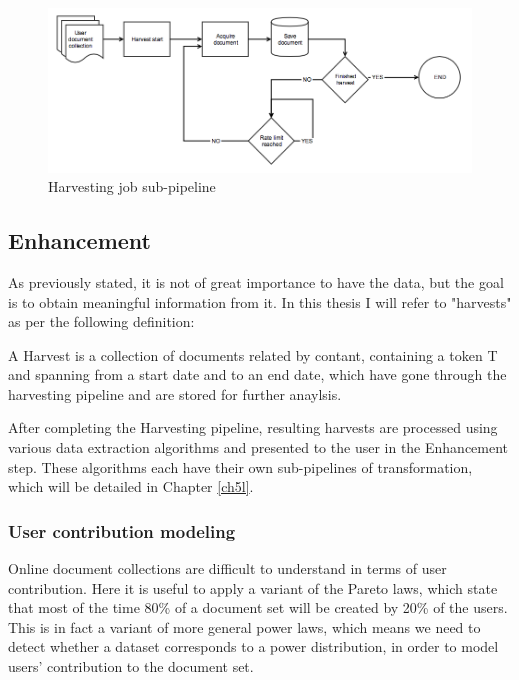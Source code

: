 \begin{figure}[ht]
    \centering
\includegraphics[width=\columnwidth]{img/harvestpipe.png}
    \caption{Harvesting job sub-pipeline}
    \label{fig:harvestpipe}
\end{figure}

\subsection{Enhancement}
As previously stated, it is not of great importance to have the data, but the goal is to obtain meaningful information from it. In this thesis I will refer to "harvests" as per the following definition:

\begin{definition}{}
A Harvest is a collection of documents related by contant, containing a token T and spanning from a start date and to an end date, which have gone through the harvesting pipeline and are stored for further anaylsis.
\end{definition}

After completing the Harvesting pipeline, resulting harvests are processed using various data extraction algorithms and presented to the user in the Enhancement step. These algorithms each have their own sub-pipelines of transformation, which will be detailed in Chapter \ref{ch5l}.

\subsubsection{User contribution modeling}
Online document collections are difficult to understand in terms of user contribution. Here it is useful to apply a variant of the Pareto laws, which state that most of the time 80\% of a document set will be created by 20\% of the users. This is in fact a variant of more general power laws, which means we need to detect whether a dataset corresponds to a power distribution, in order to model users' contribution to the document set.

